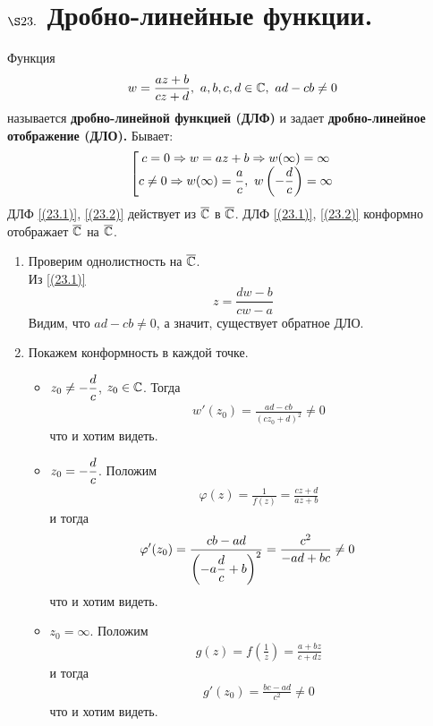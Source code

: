 \section{$\S 23.$ Дробно-линейные функции.}
\Def
Функция
\begin{equation}\label{(23.1)}
    w = \frac{az+b}{cz+d}, \ a,b,c,d \in \mathbb{C}, \ ad-cb \neq 0
\end{equation}
называется \textbf{дробно-линейной функцией (ДЛФ)} и задает
\textbf{дробно-линейное отображение (ДЛО).} Бывает:
\begin{equation}\label{(23.2)}
    \left[ \begin{matrix}
            c = 0 \Rightarrow w = az+b \Rightarrow w(\infty) = \infty \\
            c \neq 0 \Rightarrow w(\infty) = \displaystyle \frac{a}{c}, \ w\left( -\displaystyle \frac{d}{c} \right) = \infty
        \end{matrix} \right.
\end{equation}
ДЛФ \eqref{(23.1)}, \eqref{(23.2)} действует из $\overline{\mathbb{C}}$ в $\overline{\mathbb{C}}$.
\theorem
ДЛФ \eqref{(23.1)}, \eqref{(23.2)} конформно отображает $\overline{\mathbb{C}}$ на $\overline{\mathbb{C}}$.
\pr
~
\begin{enumerate}
    \item Проверим однолистность на $\overline{\mathbb{C}}$.
    \\
    Из \eqref{(23.1)}
    \begin{equation}\label{(23.3)}
        z = \frac{dw-b}{cw-a}
    \end{equation}
    Видим, что $ad - cb \neq 0$, а значит, существует обратное ДЛО.
    \item Покажем конформность в каждой точке.
    \begin{itemize}
        \item $z_0 \neq - \displaystyle \frac{d}{c}$, $z_0 \in \mathbb{C}$. Тогда
        \begin{align*}
          & w'(z_0) = \frac{ad-cb}{(cz_0+d)^2} \neq 0
        \end{align*}
        что и хотим видеть.
        \item $z_0  = -\displaystyle \frac{d}{c}$. Положим
        \begin{align*}
          & \varphi(z) = \frac{1}{f(z)} = \frac{cz+d}{az+b}
        \end{align*}
        и тогда
        \begin{align*}
          & \varphi'(z_0) = \frac{cb - ad}{\left( -a\displaystyle \frac{d}{c} + b \right)^2} = \frac{c^2}{-ad + bc} \neq 0
        \end{align*}
        что и хотим видеть.
        \item $z_0 = \infty$. Положим
        \begin{align*}
          & g(z) = f\left( \frac{1}{z} \right) = \frac{a+bz}{c+dz}
        \end{align*}
        и тогда
        \begin{align*}
          & g'(z_0) = \frac{bc - ad}{c^2} \neq 0
        \end{align*}
        что и хотим видеть.
    \end{itemize}
\end{enumerate}

